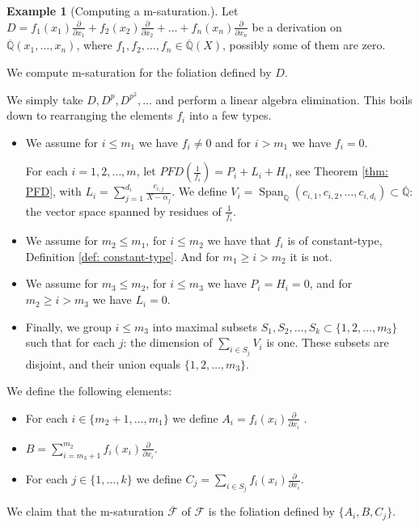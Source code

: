 \documentclass{amsart}
\newcommand{\F}{\mathcal{F}}
\newcommand{\op}{\operatorname}
\theoremstyle{definition}
\newtheorem{example}[thm]{Example}
\begin{document}
\begin{example}[Computing a m-saturation.]\label{Ex: Computing a m-saturation}
Let $D=
f_1(x_1)\frac{\partial}{\partial x_1}+f_2(x_2)\frac{\partial}{\partial x_2}+\ldots+f_n(x_n)\frac{\partial}{\partial x_n}$ be a derivation on $\overline{\mathbb{Q}}(x_1,\ldots,x_n)$, where $f_1,f_2,\ldots,f_n \in \overline{\mathbb{Q}}(X)$, possibly some of them are zero.

We compute m-saturation for the foliation defined by $D$. 

We simply take $D,D^p,D^{p^2},\ldots$ and perform a linear algebra elimination.
This boils down to rearranging the elements $f_i$ into a few types.

\begin{itemize}
    \item We assume for $i\le m_1$ we have $f_i\ne 0$ and for $i>m_1$ we have $f_i=0$.

    For each $i=1,2,\ldots,m$, let $PFD(\frac{1}{f_i})=P_i+L_i+H_i$, see Theorem \ref{thm: PFD}, with $L_i=\sum_{j=1}^{d_i}\frac{c_{i,j}}{X-\alpha_j}$. We define $V_i=\op{Span}_\mathbb{Q}(c_{i,1},c_{i,2},\ldots,c_{i,d_i})\subset \overline{\mathbb{Q}}$: the vector space spanned by residues of $\frac{1}{f_i}$.
    \item We assume for $m_2\le m_1$, for $i\le m_2$ we have that $f_i$ is of constant-type, Definition \ref{def: constant-type}. And for $m_1\ge i>m_2$ it is not.
    \item We assume for $m_3\le m_2$, for $i\le m_3$ we have $P_i=H_i=0$, and for $m_2\ge i>m_3$ we have $L_i=0$.
    \item Finally, we group $i\le m_3$ into maximal subsets $S_1,S_2,\ldots,S_k\subset \{1,2,\ldots,m_3\}$ such that for each $j$: the dimension of $\sum_{i\in S_j} V_i$ is one. These subsets are disjoint, and their union equals $\{1,2,\ldots,m_3\}$.
\end{itemize}

We define the following elements:
\begin{itemize}
    \item For each $i\in\{m_2+1,\ldots,m_1\}$ we define $A_i=f_i(x_i)\frac{\partial}{\partial x_i}$ .
    \item $B=\sum_{i=m_3+1}^{m_2}f_i(x_i)\frac{\partial}{\partial x_i}$.
    \item For each $j\in \{1,\ldots,k\}$ we define $C_j=\sum_{i\in S_j}f_i(x_i)\frac{\partial}{\partial x_i}$.
\end{itemize}

We claim that the m-saturation $\overline{\F}$ of $\F$ is the foliation defined by $\{A_i,B,C_j\}$.


\end{example}
\end{document}

